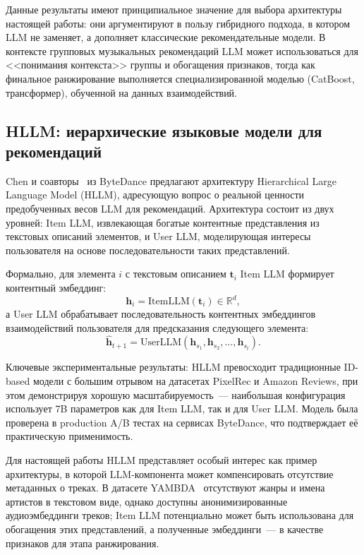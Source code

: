 Данные результаты имеют принципиальное значение для выбора архитектуры настоящей работы: они аргументируют в пользу гибридного подхода, в котором LLM не заменяет, а дополняет классические рекомендательные модели. В контексте групповых музыкальных рекомендаций LLM может использоваться для <<понимания контекста>> группы и обогащения признаков, тогда как финальное ранжирование выполняется специализированной моделью (CatBoost, трансформер), обученной на данных взаимодействий.

\subsection{HLLM: иерархические языковые модели для рекомендаций}

Chen и соавторы~\cite{chen2024hllm} из ByteDance предлагают архитектуру Hierarchical Large Language Model (HLLM), адресующую вопрос о реальной ценности предобученных весов LLM для рекомендаций. Архитектура состоит из двух уровней: Item LLM, извлекающая богатые контентные представления из текстовых описаний элементов, и User LLM, моделирующая интересы пользователя на основе последовательности таких представлений.

Формально, для элемента $i$ с текстовым описанием $\mathbf{t}_i$ Item LLM формирует контентный эмбеддинг:
\begin{equation}
    \mathbf{h}_i = \mathrm{ItemLLM}(\mathbf{t}_i) \in \mathbb{R}^d,
\end{equation}
а User LLM обрабатывает последовательность контентных эмбеддингов взаимодействий пользователя для предсказания следующего элемента:
\begin{equation}
    \hat{\mathbf{h}}_{t+1} = \mathrm{UserLLM}(\mathbf{h}_{s_1}, \mathbf{h}_{s_2}, \ldots, \mathbf{h}_{s_t}).
\end{equation}

Ключевые экспериментальные результаты: HLLM превосходит традиционные ID-based модели с большим отрывом на датасетах PixelRec и Amazon Reviews, при этом демонстрируя хорошую масштабируемость~--- наибольшая конфигурация использует 7B параметров как для Item LLM, так и для User LLM. Модель была проверена в production A/B тестах на сервисах ByteDance, что подтверждает её практическую применимость.

Для настоящей работы HLLM представляет особый интерес как пример архитектуры, в которой LLM-компонента может компенсировать отсутствие метаданных о треках. В датасете YAMBDA~\cite{yambda2025} отсутствуют жанры и имена артистов в текстовом виде, однако доступны анонимизированные аудиоэмбеддинги треков; Item LLM потенциально может быть использована для обогащения этих представлений, а полученные эмбеддинги~--- в качестве признаков для этапа ранжирования.

